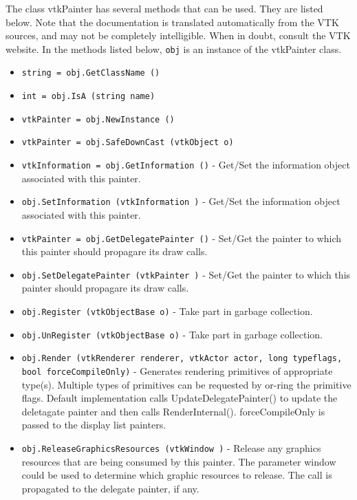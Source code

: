 The class vtkPainter has several methods that can be used.
  They are listed below.
Note that the documentation is translated automatically from the VTK sources,
and may not be completely intelligible.  When in doubt, consult the VTK website.
In the methods listed below, \verb|obj| is an instance of the vtkPainter class.
\begin{itemize}
\item  \verb|string = obj.GetClassName ()|

\item  \verb|int = obj.IsA (string name)|

\item  \verb|vtkPainter = obj.NewInstance ()|

\item  \verb|vtkPainter = obj.SafeDownCast (vtkObject o)|

\item  \verb|vtkInformation = obj.GetInformation ()| -  Get/Set the information object associated with this painter.

\item  \verb|obj.SetInformation (vtkInformation )| -  Get/Set the information object associated with this painter.

\item  \verb|vtkPainter = obj.GetDelegatePainter ()| -  Set/Get the painter to which this painter should propagare its draw calls.

\item  \verb|obj.SetDelegatePainter (vtkPainter )| -  Set/Get the painter to which this painter should propagare its draw calls.

\item  \verb|obj.Register (vtkObjectBase o)| -  Take part in garbage collection.

\item  \verb|obj.UnRegister (vtkObjectBase o)| -  Take part in garbage collection.

\item  \verb|obj.Render (vtkRenderer renderer, vtkActor actor, long typeflags, bool forceCompileOnly)| -  Generates rendering primitives of appropriate type(s). Multiple types 
 of primitives can be requested by or-ring the primitive flags. 
 Default implementation calls UpdateDelegatePainter() to update the 
 deletagate painter and then calls RenderInternal().
 forceCompileOnly is passed to the display list painters.

\item  \verb|obj.ReleaseGraphicsResources (vtkWindow )| -  Release any graphics resources that are being consumed by this painter.
 The parameter window could be used to determine which graphic
 resources to release. 
 The call is propagated to the delegate painter, if any.


\end{itemize}
